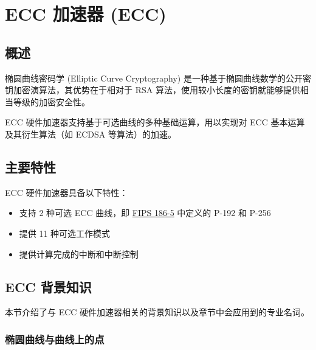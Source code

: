 \documentclass[main\_\_CN.tex]{subfiles}
\begin{document}

\ifglobal
\else
    {\let\clearpage\relax \listoftodos}
    {\let\clearpage\relax \listofdonetodos}
    \tableofcontents
\fi



\hypertarget{ecc}{}
\chapter{ECC 加速器 (ECC)}
\label{mod:ecc}


\section{概述}
椭圆曲线密码学 (Elliptic Curve Cryptography) 是一种基于椭圆曲线数学的公开密钥加密演算法，其优势在于相对于 RSA 算法，使用较小长度的密钥就能够提供相当等级的加密安全性。

\chipname{} ECC 硬件加速器支持基于可选曲线的多种基础运算，用以实现对 ECC 基本运算及其衍生算法（如 ECDSA 等算法）的加速。

\section{主要特性}
\chipname{} ECC 硬件加速器具备以下特性：

\begin{itemize}
    \item 支持 2 种可选 ECC 曲线，即 \href{https://nvlpubs.nist.gov/nistpubs/FIPS/NIST.FIPS.186-5.pdf}{FIPS 186-5} 中定义的 P-192 和 P-256
    \item 提供 11 种可选工作模式
    \item 提供计算完成的中断和中断控制
\end{itemize}

\section{ECC 背景知识}
本节介绍了与 ECC 硬件加速器相关的背景知识以及章节中会应用到的专业名词。

\subsection{椭圆曲线与曲线上的点}
\end{document}
